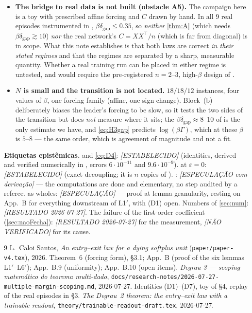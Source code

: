 \documentclass[11pt]{article}
\theoremstyle{remark}
\newcommand{\texit}{t_{\mathrm{exit}}}
\newcommand{\trel}{t_{\mathrm{release}}}
\newcommand{\dgap}{\delta_{\mathrm{gap}}}
\begin{document}
\begin{itemize}
 instances and report
$\beta(\trel-\texit)$ against both candidates.
\item[(D6)] \textbf{The bridge to real data is not built (obstacle A5).} The
campaign here is a toy with prescribed affine forcing and $C$ drawn by hand. In
all $9$ real episodes instrumented in \cite[\S3]{scoping},
$\beta\dgap\le0.35$, so \emph{neither} \cref{thm:A} (which needs
$\beta\dgap\gtrsim10$) \emph{nor} the real network's $C=XX^\top/n$ (which is far
from diagonal) is in scope. What this note establishes is that both laws are
correct \emph{in their stated regimes} and that the regimes are separated by a
sharp, measurable quantity. Whether a real training run can be placed in either
regime is untested, and would require the pre-registered $n=2$--$3$, high-$\beta$
design of \cite[\S6(ii)]{scoping}.
\item[(D7)] \textbf{$N$ is small and the transition is not located.} $18/18/12$
instances, four values of $\beta$, one forcing family (affine, one sign change).
Block~(b) deliberately biases the leader's forcing to be slow, so it tests the
two sides of the transition but does \emph{not} measure where it sits; the
$\beta\dgap\approx8$--$10$ of \cite[\S4.1]{scoping} is the only estimate we
have, and \eqref{eq:H3gap} predicts $\log(\beta\Gamma)$, which at these $\beta$
is $5$--$8$ --- the same order, which is agreement of magnitude and not a fit.
\end{itemize}

\bigskip
\noindent\textbf{Etiquetas epist\^emicas.}
 and \eqref{eq:D4}: \emph{[ESTABELECIDO]} (identities, derived and
verified numerically in \cite{scoping}, errors $6\cdot10^{-11}$ and
$9.6\cdot10^{-9}$).
 at $\varepsilon=0$: \emph{[ESTABELECIDO]} (exact decoupling; it is
$n$ copies of \cite[L1$'$]{paper}).
: \emph{[ESPECULA\c{C}\~AO com deriva\c{c}\~ao]}
--- the computations are done and elementary, no step audited by a referee.
 as wholes: \emph{[ESPECULA\c{C}\~AO]} --- proof at lemma
granularity, resting on \cite{paper} App.~B for everything downstream of L1$'$,
with (D1) open.
Numbers of \cref{sec:num}: \emph{[RESULTADO 2026-07-27]}.
The failure of the first-order coefficient (\cref{sec:naoFecha}):
\emph{[RESULTADO 2026-07-27]} for the measurement,
\emph{[N\~AO VERIFICADO]} for its cause.

\begin{thebibliography}{9}
 L.~Caloi Santos, \emph{An entry--exit law for a dying softplus
unit} (\texttt{paper/paper-v4.tex}), 2026. Theorem~6 (forcing form),
\S3.1; App.~B (proof of the six lemmas L1$'$--L6$'$); App.~B.9 (uniformity);
App.~B.10 (open items).
 \emph{Degrau 3 --- scoping matem\'atico do teorema
multi-dado}, \texttt{docs/research-notes/2026-07-27-multiple-margin-scoping.md}, 2026-07-27.
Identities (D1)--(D7), toy of \S4, replay of the real episodes in \S3.
 \emph{The Degrau~2 theorem: the entry--exit law with a
trainable readout}, \texttt{theory/trainable-readout-draft.tex},
2026-07-27.
\end{thebibliography}
\end{document}
